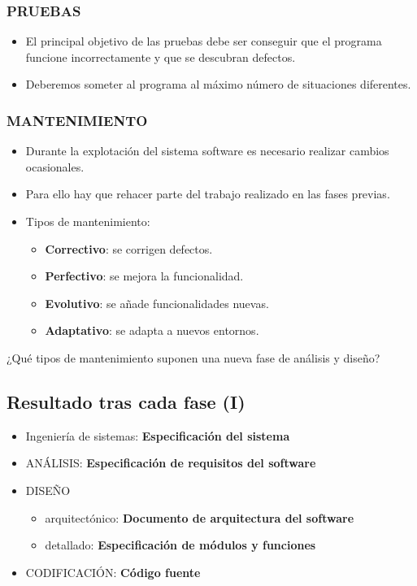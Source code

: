 \documentclass[a4paper]{article}
\begin{document}
\subsubsection{PRUEBAS}
\label{pruebas}
\begin{itemize}
\item El principal objetivo de las pruebas debe ser conseguir que el
programa funcione incorrectamente y que se descubran defectos.
\item Deberemos someter al programa al máximo número de situaciones
diferentes.
\end{itemize}
\subsubsection{MANTENIMIENTO}
\label{mantenimiento}
\begin{itemize}
\item Durante la explotación del sistema software es necesario realizar
cambios ocasionales.
\item Para ello hay que rehacer parte del trabajo realizado en las fases
previas.
\item Tipos de mantenimiento:
\begin{itemize}
\item \textbf{Correctivo}: se corrigen defectos.
\item \textbf{Perfectivo}: se mejora la funcionalidad.
\item \textbf{Evolutivo}: se añade funcionalidades nuevas.
\item \textbf{Adaptativo}: se adapta a nuevos entornos.
\end{itemize}
\end{itemize}

¿Qué tipos de mantenimiento suponen una nueva fase de análisis y diseño?    
\subsection{Resultado tras cada fase (I)}
\label{resultado-tras-cada-fase-i}
\begin{itemize}
\item Ingeniería de sistemas: \textbf{Especificación del sistema}
\item ANÁLISIS: \textbf{Especificación de requisitos del software}
\item DISEÑO
\begin{itemize}
\item arquitectónico: \textbf{Documento de arquitectura del software}
\item detallado: \textbf{Especificación de módulos y funciones}
\end{itemize}
\item CODIFICACIÓN: \textbf{Código fuente}
\end{itemize}
\end{document}
